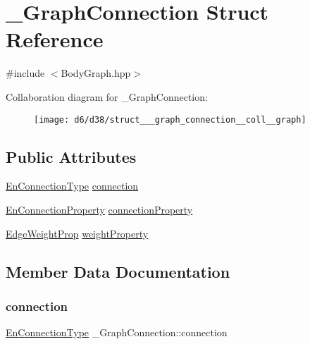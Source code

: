 \hypertarget{struct___graph_connection}{}\section{\+\_\+\+Graph\+Connection Struct Reference}
\label{struct___graph_connection}


{\ttfamily \#include $<$Body\+Graph.\+hpp$>$}



Collaboration diagram for \+\_\+\+Graph\+Connection\+:
\nopagebreak
\begin{figure}[H]
\begin{center}
\leavevmode
\texttt{[image: d6/d38/struct\_\_\_graph\_connection\_\_coll\_\_graph]}
\end{center}
\end{figure}
\subsection*{Public Attributes}
\begin{DoxyCompactItemize}
\item 
\mbox{\hyperlink{_body_graph_8hpp_a1a9cb52373e2881d50e8971ff4a37803}{En\+Connection\+Type}} \mbox{\hyperlink{struct___graph_connection_a3111812a1c3863ecfb33757dce869efe}{connection}}
\item 
\mbox{\hyperlink{_body_graph_8hpp_aaf075ead75a7b8171312447a8e13aab8}{En\+Connection\+Property}} \mbox{\hyperlink{struct___graph_connection_ab4f55b760335b06eb893f9abded06939}{connection\+Property}}
\item 
\mbox{\hyperlink{_body_graph_8hpp_aca4f327513ae6b3eeddfb5d9ccff4eb7}{Edge\+Weight\+Prop}} \mbox{\hyperlink{struct___graph_connection_a243a1a161c39bafe16a580f2fca162d1}{weight\+Property}}
\end{DoxyCompactItemize}


\subsection{Member Data Documentation}
\mbox{\label{struct___graph_connection_a3111812a1c3863ecfb33757dce869efe}} 
\subsubsection{\texorpdfstring{connection}{connection}}
{\footnotesize\ttfamily \mbox{\hyperlink{_body_graph_8hpp_a1a9cb52373e2881d50e8971ff4a37803}{En\+Connection\+Type}} \+\_\+\+Graph\+Connection\+::connection}

